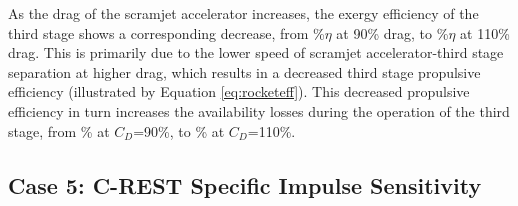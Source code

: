 As the drag of the scramjet accelerator increases, the exergy efficiency of the third stage shows a corresponding decrease, from \thirddExergyEffCdNinetyNoReturn\%$\eta$ at 90\% drag, to \thirddExergyEffCdOneHundredTenNoReturn\%$\eta$ at 110\% drag.
This is primarily due to the lower speed of scramjet accelerator-third stage separation at higher drag, which results in a decreased third stage propulsive efficiency (illustrated by Equation \ref{eq:rocketeff}). This decreased propulsive efficiency in turn increases the availability losses during the operation of the third stage, from \PlossthreeCdNinetyNoReturn\% at $C_D$=90\%, to \PlossthreeCdOneHundredTenNoReturn\% at $C_D$=110\%.


\subsection{Case 5: C-REST Specific Impulse Sensitivity}\label{sec:ispsensitivitynoflyback}

